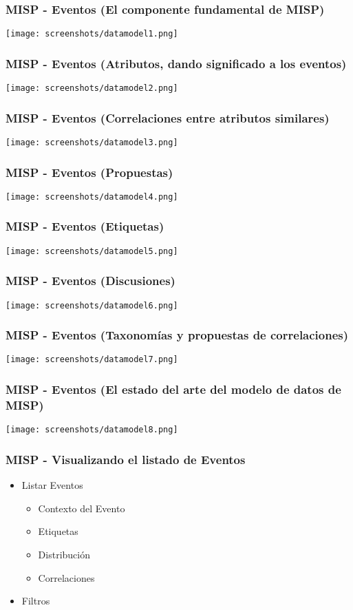 \begin{frame}
    \frametitle{MISP - Eventos (El componente fundamental de MISP)}
    \texttt{[image: screenshots/datamodel1.png]}
\end{frame}

\begin{frame}
    \frametitle{MISP - Eventos (Atributos, dando significado a los eventos)}
    \texttt{[image: screenshots/datamodel2.png]}
\end{frame}

\begin{frame}
    \frametitle{MISP - Eventos (Correlaciones entre atributos similares)}
    \texttt{[image: screenshots/datamodel3.png]}
\end{frame}

\begin{frame}
    \frametitle{MISP - Eventos (Propuestas)}
    \texttt{[image: screenshots/datamodel4.png]}
\end{frame}

\begin{frame}
    \frametitle{MISP - Eventos (Etiquetas)}
    \texttt{[image: screenshots/datamodel5.png]}
\end{frame}

\begin{frame}
    \frametitle{MISP - Eventos (Discusiones)}
    \texttt{[image: screenshots/datamodel6.png]}
\end{frame}

\begin{frame}
    \frametitle{MISP - Eventos (Taxonomías y propuestas de correlaciones)}
    \texttt{[image: screenshots/datamodel7.png]}
\end{frame}

\begin{frame}
    \frametitle{MISP - Eventos (El estado del arte del modelo de datos de MISP)}
    \texttt{[image: screenshots/datamodel8.png]}
\end{frame}

\begin{frame}
    \frametitle{MISP - Visualizando el listado de Eventos}
    \begin{itemize}
    \item Listar Eventos
        \begin{itemize}
            \item Contexto del Evento
            \item Etiquetas
            \item Distribución
            \item Correlaciones
        \end{itemize}
    \item Filtros
    \end{itemize}
\end{frame}

